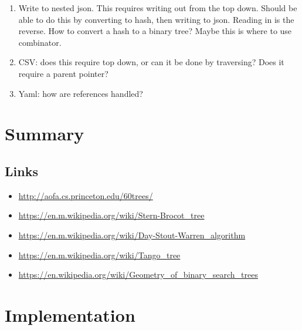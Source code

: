 \documentclass{article}
\begin{document}
\begin{enumerate}
\item Write to nested json. This requires writing out from the top
down. Should be able to do this by converting to hash, then
writing to json. Reading in is the reverse. How to convert a
hash to a binary tree? Maybe this is where to use combinator.

\item CSV: does this require top down, or can it be done by traversing?
Does it require a parent pointer?

\item Yaml: how are references handled?
\end{enumerate}


\section{Summary}


\subsection{Links}

\begin{itemize}
\item \href{http://aofa.cs.princeton.edu/60trees/}{http://aofa.cs.princeton.edu/60trees/}
\item \href{https://en.m.wikipedia.org/wiki/Stern-Brocot\_tree}{https://en.m.wikipedia.org/wiki/Stern-Brocot\_tree}
\item \href{https://en.m.wikipedia.org/wiki/Day-Stout-Warren\_algorithm}{%
https://en.m.wikipedia.org/wiki/Day-Stout-Warren\_algorithm}
\item \href{https://en.m.wikipedia.org/wiki/Tango\_tree}{https://en.m.wikipedia.org/wiki/Tango\_tree}
\item \href{https://en.wikipedia.org/wiki/Geometry\_of\_binary\_search\_trees}{%
https://en.wikipedia.org/wiki/Geometry\_of\_binary\_search\_trees}
\end{itemize}



{}



\appendix

\section{Implementation}
\end{document}
